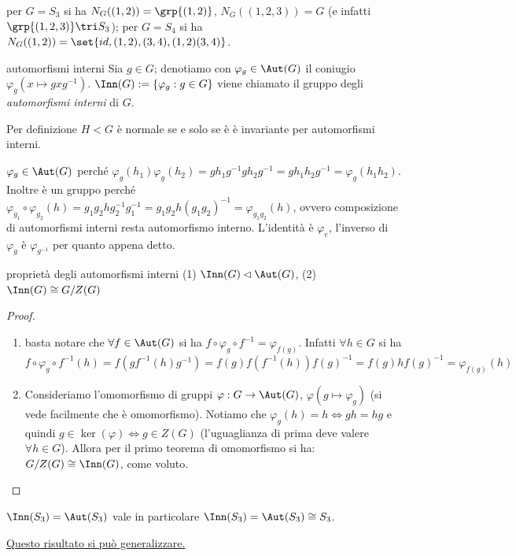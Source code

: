 \begin{example}
    per $G = S_3$ si ha $N_G((1,2)) = \grp{(1,2)}$, $N_G((1,2,3)) = G$ (e infatti $\grp{(1,2,3)} \tri S_3$); per $G = S_4$ si ha $N_G((1,2)) = \set{id,(1,2),(3,4),(1,2)(3,4)}$.
\end{example}
\begin{definition}{automorfismi interni}
    Sia $g \in G$; denotiamo con $\varphi_g \in \Aut(G)$ il coniugio $\varphi_g(x \mapsto gxg^{-1})$. $\Inn(G) := \{\varphi_g : g \in G\}$ viene chiamato il gruppo degli \textit{automorfismi interni} di $G$.
\end{definition}
Per definizione $H < G$ è normale se e solo se è è invariante per automorfismi interni.
\begin{bdef}
    $\varphi_g \in \Aut(G)$ perché $\varphi_g(h_1)\varphi_g(h_2) = gh_1g^{-1}gh_2g^{-1} = gh_1h_2g^{-1} = \varphi_g(h_1h_2)$. Inoltre è un gruppo perché $\varphi_{g_1}\circ\varphi_{g_2}(h) = g_1g_2hg_2^{-1}g_1^{-1} = g_1g_2h(g_1g_2)^{-1} = \varphi_{g_1g_2}(h)$, ovvero composizione di automorfismi interni resta automorfismo interno. L'identità è $\varphi_e$, l'inverso di $\varphi_g$ è $\varphi_{g^{-1}}$ per quanto appena detto.
\end{bdef}
\begin{proposition}{proprietà degli automorfismi interni}
    (1) $\Inn(G) \lhd \Aut(G)$, (2) $\Inn(G) \cong G/Z(G)$
\end{proposition}
\begin{proof} 
    \begin{enumerate}
    \item[(1)] basta notare che $\forall f \in \Aut(G)$ si ha $f \circ \varphi_g \circ f^{-1} = \varphi_{f(g)}$. Infatti $\forall h \in G$ si ha $f \circ \varphi_g \circ f^{-1}(h) = f(gf^{-1}(h)g^{-1}) = f(g)f(f^{-1}(h))f(g)^{-1} = f(g)hf(g)^{-1} = \varphi_{f(g)}(h)$
    \item[(2)] Consideriamo l'omomorfismo di gruppi $\varphi: G \rightarrow \Aut(G)$, $\varphi(g \mapsto \varphi_g)$ (si vede facilmente che è omomorfismo). Notiamo che $\varphi_g(h) = h \iff gh = hg$ e quindi $g \in \ker(\varphi) \iff g \in Z(G)$ (l'uguaglianza di prima deve valere $\forall h \in G$). Allora per il primo teorema di omomorfismo si ha: $G/Z(G) \cong \Inn(G)$, come voluto. 
    \end{enumerate}
    \end{proof}
\begin{example2}{\normalfont $\Inn(S_3) = \Aut(S_3)$}
    vale in particolare  $\Inn(S_3) = \Aut(S_3) \cong S_3$.

    \hyperlink{InnSn}{Questo risultato si può generalizzare.}
\end{example2}
